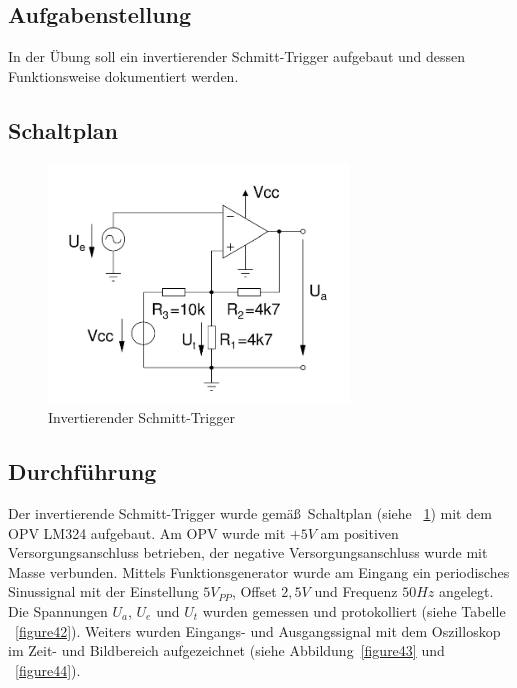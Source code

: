 \documentclass[12pt,a4paper,titlepage]{article}
\begin{document}
\subsection*{Aufgabenstellung}
In der \"Ubung soll ein invertierender Schmitt-Trigger aufgebaut und dessen Funktionsweise dokumentiert werden.

\subsection*{Schaltplan}
\begin{figure}[H]
  \centering
  \includegraphics[width=80mm]{i_schmitt_trigger_schaltung.png}
  \caption{Invertierender Schmitt-Trigger}
  \label{figure41}
\end{figure}


\subsection*{Durchf\"uhrung}
Der invertierende Schmitt-Trigger wurde gem\"a\ss \, Schaltplan (siehe ~\ref{figure41}) mit dem OPV LM324 aufgebaut. Am OPV wurde mit $+5V$ am positiven Versorgungsanschluss betrieben, der negative Versorgungsanschluss wurde mit Masse verbunden. Mittels Funktionsgenerator wurde am Eingang ein periodisches Sinussignal mit der Einstellung $5 V_{PP}$, Offset $2,5V$ und Frequenz $50Hz$ angelegt. Die Spannungen $U_a$, $U_e$ und $U_t$ wurden gemessen und protokolliert (siehe Tabelle ~\ref{figure42}). Weiters wurden Eingangs- und Ausgangssignal mit dem Oszilloskop im Zeit- und Bildbereich aufgezeichnet (siehe Abbildung~\ref{figure43} und ~\ref{figure44}).
\end{document}
